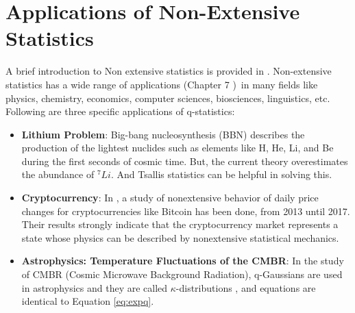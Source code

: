 \documentclass[11pt]{article}
\numberwithin{equation}{section}
\begin{document}
\section{Applications of Non-Extensive Statistics}
A brief introduction to Non extensive statistics is provided in \cite{asdfasdf}. Non-extensive statistics has a wide range of applications (Chapter 7 \cite{tsallis2009introduction})$\,$ in many fields like physics, chemistry, economics, computer sciences, biosciences, linguistics, etc. Following are three specific applications of q-statistics:
\begin{itemize}
    \item \textbf{Lithium Problem}: Big-bang nucleosynthesis (BBN) describes the production of the lightest nuclides such as elements like H, He, Li, and Be during the first seconds of cosmic time. But, the current theory overestimates the abundance of $^{7}Li$. And Tsallis statistics can be helpful in solving this. 
    \item \textbf{Cryptocurrency}: In \cite{STOSIC20181069}, a study of nonextensive behavior of daily price changes for cryptocurrencies like Bitcoin has been done, from 2013 until 2017. Their results strongly indicate that the cryptocurrency market represents a state whose physics can be described by nonextensive statistical mechanics.
    \item \textbf{Astrophysics: Temperature Fluctuations of the CMBR}: In the study of CMBR (Cosmic Microwave Background Radiation), q-Gaussians are used in astrophysics and they are called $\kappa$-distributions \cite{10.1007/978-94-010-3467-8_23}, and equations are identical to Equation \ref{eq:expq}.
\end{itemize}
\end{document}
